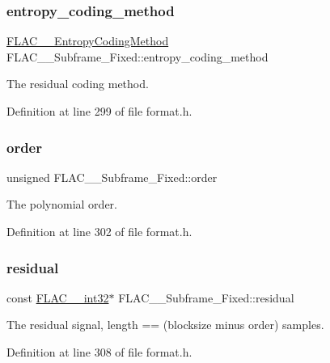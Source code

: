 \subsubsection{\texorpdfstring{entropy\_coding\_method}{entropy\_coding\_method}}
{\footnotesize\ttfamily \mbox{\hyperlink{struct_f_l_a_c_____entropy_coding_method}{F\+L\+A\+C\+\_\+\+\_\+\+Entropy\+Coding\+Method}} F\+L\+A\+C\+\_\+\+\_\+\+Subframe\+\_\+\+Fixed\+::entropy\+\_\+coding\+\_\+method}

The residual coding method. 

Definition at line 299 of file format.\+h.

\mbox{\label{struct_f_l_a_c_____subframe___fixed_a73f6f3cce3f811c81532729dbad2df0d}} 
\subsubsection{\texorpdfstring{order}{order}}
{\footnotesize\ttfamily unsigned F\+L\+A\+C\+\_\+\+\_\+\+Subframe\+\_\+\+Fixed\+::order}

The polynomial order. 

Definition at line 302 of file format.\+h.

\mbox{\label{struct_f_l_a_c_____subframe___fixed_ab91be48874aec97177106a4086163188}} 
\subsubsection{\texorpdfstring{residual}{residual}}
{\footnotesize\ttfamily const \mbox{\hyperlink{ordinals_8h_a33fd77bfe6d685541a0c034a75deccdc}{F\+L\+A\+C\+\_\+\+\_\+int32}}$\ast$ F\+L\+A\+C\+\_\+\+\_\+\+Subframe\+\_\+\+Fixed\+::residual}

The residual signal, length == (blocksize minus order) samples. 

Definition at line 308 of file format.\+h.

\mbox{\label{struct_f_l_a_c_____subframe___fixed_a0e9a40fb89b8aa45f83bf8979d200f1f}} 
